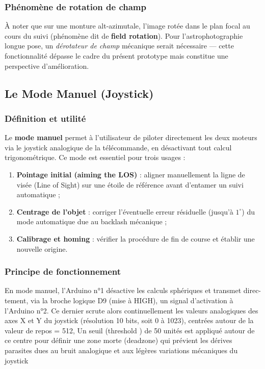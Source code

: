 \documentclass[12pt,a4paper]{report}
\begin{document}
\begin{enumerate}
\begin{figure}[H]
\end{figure}
\subsubsection{Phénomène de rotation de champ}
À noter que sur une monture alt-azimutale, l'image rotée dans le plan focal au cours du suivi (phénomène dit de \textbf{field rotation}). Pour l'astrophotographie longue pose, un \textit{dérotateur de champ} mécanique serait nécessaire — cette fonctionnalité dépasse le cadre du présent prototype mais constitue une perspective d'amélioration.

\subsection{Le Mode Manuel (Joystick)}
\subsubsection{Définition et utilité}
Le \textbf{mode manuel} permet à l'utilisateur de piloter directement les deux moteurs via le joystick analogique de la télécommande, en désactivant tout calcul trigonométrique. Ce mode est essentiel pour trois usages :
\begin{enumerate}
    \item \textbf{Pointage initial (aiming the LOS)} : aligner manuellement la ligne de visée (Line of Sight) sur une étoile de référence avant d'entamer un suivi automatique ;
    \item \textbf{Centrage de l'objet} : corriger l'éventuelle erreur résiduelle (jusqu'à $1^\circ$) du mode automatique due au backlash mécanique ;
    \item \textbf{Calibrage et homing} : vérifier la procédure de fin de course et établir une nouvelle origine.
\end{enumerate}

\subsubsection{Principe de fonctionnement}
En mode manuel, l’Arduino n°1 désactive les calculs sphériques et transmet direc-
tement, via la broche logique D9 (mise à HIGH), un signal d’activation à l’Arduino
n°2. Ce dernier scrute alors continuellement les valeurs analogiques des axes X et
Y du joystick (résolution 10 bits, soit 0 à 1023), centrées autour de la valeur de
repos = 512, Un seuil (threshold ) de 50 unités est appliqué autour de ce centre pour
définir une zone morte (deadzone) qui prévient les dérives parasites dues au bruit
analogique et aux légères variations mécaniques du joystick


\end{enumerate}
\end{document}
